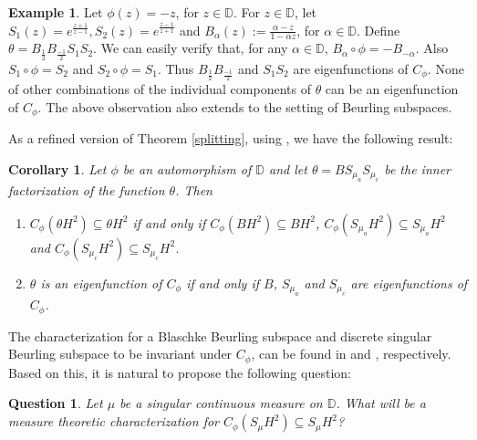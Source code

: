 \documentclass[12pt, reqno]{amsart}
\newtheorem {question}[theorem]{Question}
\newtheorem{corollary}[theorem]{Corollary}
\theoremstyle{definition}
\newtheorem{example}[theorem]{Example}
\numberwithin{equation}{section}
\begin{document}
\begin{example}
Let $\phi(z)=-z$, for $z \in \mathbb{D}$. For $z \in \mathbb{D}$, let $S_1(z)=e^{\frac{z+1}{z-1}}, S_2(z)=e^{\frac{z-1}{z+1}}$ and  $B_{\alpha}(z):=\frac{\alpha-z}{1-\bar{\alpha}z}$, for $\alpha \in \mathbb{D}$. Define  $\theta=B_{\frac{1}{2}}B_{\frac{-1}{2}}S_1S_2$. We can easily verify that, for any $\alpha \in \mathbb{D}$, $B_{\alpha}\circ \phi=-B_{-\alpha}$. Also $S_1\circ \phi=S_2$ and $S_2\circ \phi=S_1$. Thus  $B_{\frac{1}{2}}B_{\frac{-1}{2}}$ and $S_1S_2$ are eigenfunctions of $C_\phi$. None of other combinations of the individual components of $\theta$ can be an eigenfunction of $C_\phi$. The above observation also extends to the setting of Beurling subspaces.
\end{example}



As a refined version of Theorem \ref{splitting}, using \cite[Corollary 3.11]{article1}, we have the following result:
\begin{corollary}\label{corsplit}
	Let $\phi$ be an automorphism of $\mathbb{D}$ and let $\theta= BS_{\mu_a}S_{\mu_c}$ be the inner factorization of the function $\theta$. Then
	\begin{enumerate}
		\item $C_\phi(\theta H^2)\subseteq \theta H^2$ if and only if  $C_\phi(B H^2)\subseteq BH^2$, $C_\phi(S_{\mu_a} H^2)\subseteq S_{\mu_a }H^2$ and $C_\phi(S_{\mu_c} H^2)\subseteq S_{\mu_c }H^2$.
		\item $\theta$ is an eigenfunction of $C_\phi$ if and only if $B$, $S_{\mu_a}$ and $S_{\mu_c}$ are eigenfunctions of $C_\phi$.
	\end{enumerate}

\end{corollary}

The characterization for a Blaschke Beurling subspace and discrete singular Beurling subspace to be invariant under $C_\phi$, can be found in \cite[Corollary 2.4]{buerlingtype} and \cite[Corollary 2.15]{valentine}, respectively. Based on this, it is natural to propose the following question:
\begin{question}
	Let $\mu$ be a singular continuous measure on $\mathbb{D}$. What will be a measure theoretic characterization for $C_\phi(S_{\mu} H^2)\subseteq S_{\mu }H^2$?
\end{question}
\end{document}
